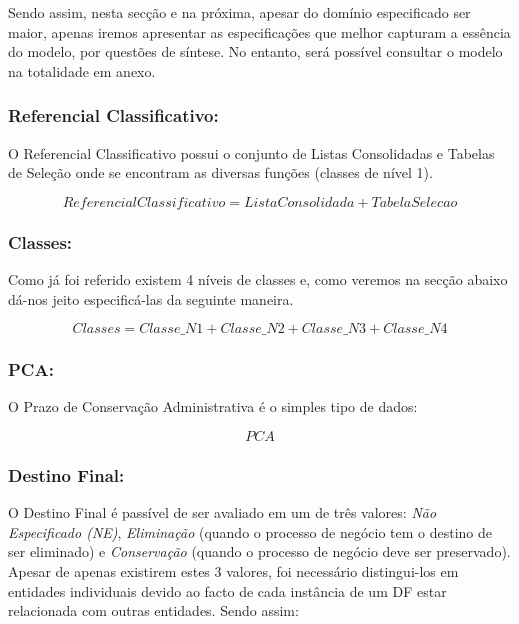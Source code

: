 \documentclass[tikz,runningheads,a4paper]{llncs}
\begin{document}
Sendo assim, nesta secção e na próxima, apesar do domínio especificado ser maior, apenas iremos apresentar as especificações que melhor capturam a essência do modelo, por questões de síntese. No entanto, será possível consultar o modelo na totalidade em anexo.

\subsubsection{Referencial Classificativo:}

O Referencial Classificativo possui o conjunto de Listas Consolidadas e Tabelas de Seleção onde se encontram as diversas funções (classes de nível 1).

\begin{equation*}
    ReferencialClassificativo = ListaConsolidada + TabelaSelecao
\end{equation*}

\subsubsection{Classes:}

Como já foi referido existem 4 níveis de classes e, como veremos na secção abaixo dá-nos jeito especificá-las da seguinte maneira.

\begin{equation*}
    Classes = Classe\_N1 + Classe\_N2 + Classe\_N3 + Classe\_N4
\end{equation*}

\subsubsection{PCA:}

O Prazo de Conservação Administrativa é o simples tipo de dados:

\begin{equation*}
    PCA
\end{equation*}

\subsubsection{Destino Final:}

O Destino Final é passível de ser avaliado em um de três valores: \textit{Não Especificado (NE)}, \textit{Eliminação} (quando o processo de negócio tem o destino de ser eliminado) e \textit{Conservação} (quando o processo de negócio deve ser preservado). Apesar de apenas existirem estes 3 valores, foi necessário distingui-los em entidades individuais devido ao facto de cada instância de um DF estar relacionada com outras entidades. Sendo assim:
\end{document}
